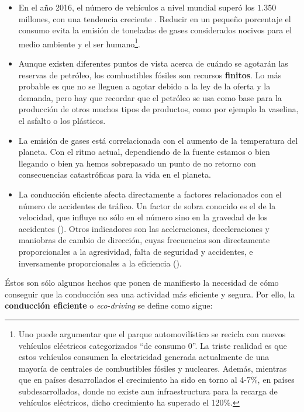 \begin{itemize}
	\item En el año 2016, el número de vehículos a nivel mundial superó los $1.350$ millones, con una tendencia creciente \cite{oica2014motrate}. Reducir en un pequeño porcentaje el consumo evita la emisión de toneladas de gases considerados nocivos para el medio ambiente y el ser humano\footnote{
		Uno puede argumentar que el parque automovilístico se recicla con nuevos vehículos eléctricos categorizados \enquote{de consumo $0$}. La triste realidad es que estos vehículos consumen la electricidad generada actualmente de una mayoría de centrales de combustibles fósiles y nucleares. Además, mientras que en países desarrollados el crecimiento ha sido en torno al 4-7\%, en países subdesarrollados, donde no existe aun infraestructura para la recarga de vehículos eléctricos, dicho crecimiento ha superado el 120\%.
	}.
	\item Aunque existen diferentes puntos de vista acerca de cuándo se agotarán las reservas de petróleo, los combustibles fósiles son recursos \textbf{finitos}. Lo más probable es que no se lleguen a agotar debido a la ley de la oferta y la demanda, pero hay que recordar que el petróleo se usa como base para la producción de otros muchos tipos de productos, como por ejemplo la vaselina, el asfalto o los plásticos.
	\item La emisión de gases está correlacionada con el aumento de la temperatura del planeta. Con el ritmo actual, dependiendo de la fuente estamos o bien llegando o bien ya hemos sobrepasado un punto de no retorno con consecuencias catastróficas para la vida en el planeta.
	\item La conducción eficiente afecta directamente a factores relacionados con el número de accidentes de tráfico. Un factor de sobra conocido es el de la velocidad, que influye no sólo en el número sino en la gravedad de los accidentes (\cite{imprialou2016re}). Otros indicadores son las aceleraciones, deceleraciones y maniobras de cambio de dirección, cuyas frecuencias son directamente proporcionales a la agresividad, falta de seguridad y accidentes, e inversamente proporcionales a la eficiencia (\cite{dingus2006100, lerner2010exploration}).
\end{itemize}

Éstos son sólo algunos hechos que ponen de manifiesto la necesidad de cómo conseguir que la conducción sea una actividad más eficiente y segura. Por ello, la \textbf{conducción eficiente} o \textit{eco-driving} se define como sigue:

